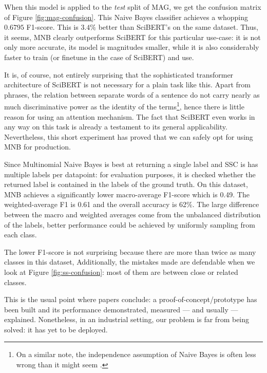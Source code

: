 When this model is applied to the \textit{test} split of MAG, we get the confusion matrix of Figure \ref{fig:mag-confusion}. This Naive Bayes classifier achieves a whopping $0.6795$ F1-score. This is $3.4\%$ better than SciBERT's on the same dataset. Thus, it seems, MNB clearly outperforms SciBERT for this particular use-case: it is not only more accurate, its model is magnitudes smaller, while it is also considerably faster to train (or finetune in the case of SciBERT) and use.

It is, of course, not entirely surprising that the sophisticated transformer architecture of SciBERT is not necessary for a plain task like this. Apart from phrases, the relation between separate words of a sentence do not carry nearly as much discriminative power as the identity of the terms\footnote{On a similar note, the independence assumption of Naive Bayes is often less wrong than it might seem \cite{hand2001idiot}.}, hence there is little reason for using an attention mechanism. The fact that SciBERT even works in any way on this task is already a testament to its general applicability. Nevertheless, this short experiment has proved that we can safely opt for using MNB for production.

Since Multinomial Naive Bayes is best at returning a single label and SSC is has multiple labels per datapoint: for evaluation purposes, it is checked whether the returned label is contained in the labels of the ground truth. On this dataset, MNB achieves a significantly lower macro-average F1-score which is 0.49. The weighted-average F1 is 0.61 and the overall accuracy is 62\%. The large difference between the macro and weighted averages come from the unbalanced distribution of the labels, better performance could be achieved by uniformly sampling from each class.

The lower F1-score is not surprising because there are more than twice as many classes in this dataset,  Additionally, the mistakes made are defendable when we look at Figure \ref{fig:ss-confusion}: most of them are between close or related classes.

\begin{displayquote}
This is the usual point where papers conclude: a proof-of-concept/prototype has been built and its performance demonstrated, measured --- and usually --- explained. Nonetheless, in an industrial setting, our problem is far from being solved: it has yet to be deployed.
\end{displayquote}

